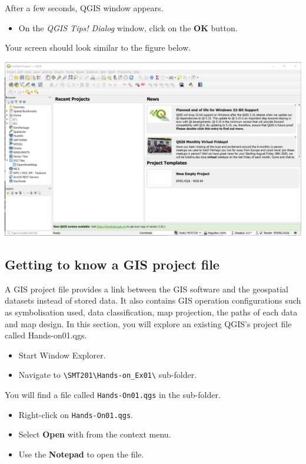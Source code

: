 \documentclass[
  letterpaper,
  DIV=11,
  numbers=noendperiod]{scrreprt}
\providecommand{\tightlist}{%
  \setlength{\itemsep}{0pt}\setlength{\parskip}{0pt}}\usepackage{longtable,booktabs,array}
\begin{document}
After a few seconds, QGIS window appears.

\begin{itemize}
\tightlist
\item
  On the \emph{QGIS Tips! Dialog} window, click on the \textbf{OK}
  button.
\end{itemize}

Your screen should look similar to the figure below.

\includegraphics{./img/image1-5.jpg}

\hypertarget{getting-to-know-a-gis-project-file}{%
\subsection{Getting to know a GIS project
file}\label{getting-to-know-a-gis-project-file}}

A GIS project file provides a link between the GIS software and the
geospatial datasets instead of stored data. It also contains GIS
operation configurations such as symbolisation used, data
classification, map projection, the paths of each data and map design.
In this section, you will explore an existing QGIS's project file called
Hands-on01.qgs.

\begin{itemize}
\tightlist
\item
  Start Window Explorer.
\item
  Navigate to
  \texttt{\textbackslash{}SMT201\textbackslash{}Hands-on\_Ex01\textbackslash{}}
  sub-folder.
\end{itemize}

You will find a file called \texttt{Hands-On01.qgs} in the sub-folder.

\begin{itemize}
\tightlist
\item
  Right-click on \texttt{Hands-On01.qgs}.
\item
  Select \textbf{Open} with from the context menu.
\item
  Use the \textbf{Notepad} to open the file.
\end{itemize}
\end{document}
